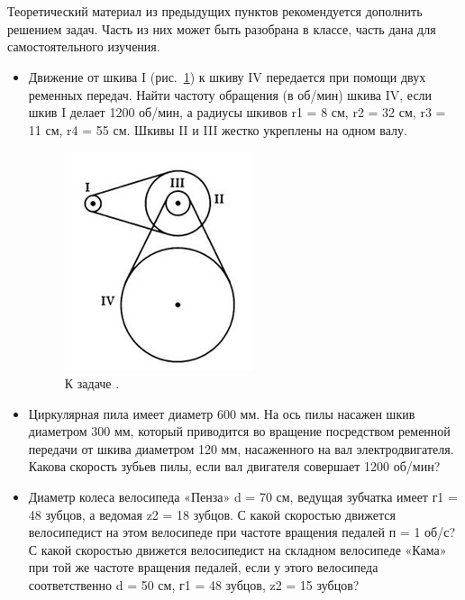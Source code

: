 {\hypertarget{lesson6x4}{}}\\\\

Теоретический материал из предыдущих пунктов рекомендуется дополнить решением задач. Часть из них может быть разобрана в классе, часть дана для самостоятельного изучения.
\begin{itemize}
	\renewcommand{\labelitemi}{\stepcounter{tasks}\Roman{tasks}.}
	\item Движение от шкива I (рис.~\ref{ris:image6x5}) к шкиву IV передается при помощи двух ременных передач. Найти частоту обращения (в об/мин) шкива IV, если шкив I делает 1200 об/мин, а радиусы шкивов r1 = 8 см, r2 = 32 см, r3 = 11 см, r4 = 55 см. Шкивы II и III жестко укреплены на одном валу.
	\clearpage
	\begin{figure}[h!]
		\begin{center}
			\includegraphics[width=0.8\linewidth]{chapters/chapter6/images/5}
			\caption{К задаче .}
			\label{ris:image6x5}
		\end{center}
	\end{figure}
	\item Циркулярная пила имеет диаметр 600 мм. На ось пилы насажен шкив диаметром 300 мм, который приводится во вращение посредством ременной передачи от шкива диаметром 120 мм, насаженного на вал электродвигателя. Какова скорость зубьев пилы, если вал двигателя совершает 1200 об/мин?
	\item Диаметр колеса велосипеда «Пенза» d = 70 см, ведущая зубчатка имеет г1 = 48 зубцов, а ведомая z2 = 18 зубцов. С какой скоростью движется велосипедист на этом велосипеде при частоте вращения педалей п = 1 об/с? С какой скоростью движется велосипедист на складном велосипеде «Кама» при той же частоте вращения педалей, если у этого велосипеда соответственно d = 50 см, г1 = 48 зубцов, z2 = 15 зубцов?
\end{itemize}
\clearpage
{\hypertarget{lesson6x5}{}}\\\\

